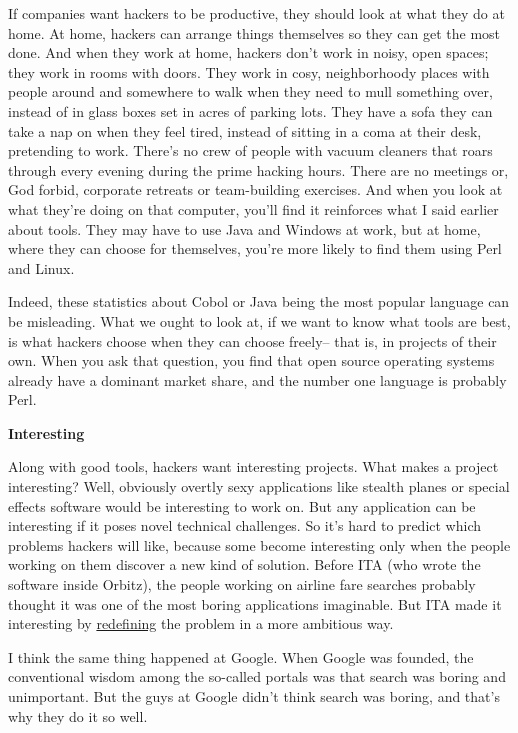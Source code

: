 If companies want hackers to be productive, they should look at what
they do at home. At home, hackers can arrange things themselves so they
can get the most done. And when they work at home, hackers don't work in
noisy, open spaces; they work in rooms with doors. They work in cosy,
neighborhoody places with people around and somewhere to walk when they
need to mull something over, instead of in glass boxes set in acres of
parking lots. They have a sofa they can take a nap on when they feel
tired, instead of sitting in a coma at their desk, pretending to work.
There's no crew of people with vacuum cleaners that roars through every
evening during the prime hacking hours. There are no meetings or, God
forbid, corporate retreats or team-building exercises. And when you look
at what they're doing on that computer, you'll find it reinforces what I
said earlier about tools. They may have to use Java and Windows at work,
but at home, where they can choose for themselves, you're more likely to
find them using Perl and Linux.

Indeed, these statistics about Cobol or Java being the most popular
language can be misleading. What we ought to look at, if we want to know
what tools are best, is what hackers choose when they can choose
freely-- that is, in projects of their own. When you ask that question,
you find that open source operating systems already have a dominant
market share, and the number one language is probably Perl.

\textbf{Interesting}

Along with good tools, hackers want interesting projects. What makes a
project interesting? Well, obviously overtly sexy applications like
stealth planes or special effects software would be interesting to work
on. But any application can be interesting if it poses novel technical
challenges. So it's hard to predict which problems hackers will like,
because some become interesting only when the people working on them
discover a new kind of solution. Before ITA (who wrote the software
inside Orbitz), the people working on airline fare searches probably
thought it was one of the most boring applications imaginable. But ITA
made it interesting by \href{carl.html}{redefining} the problem in a
more ambitious way.

I think the same thing happened at Google. When Google was founded, the
conventional wisdom among the so-called portals was that search was
boring and unimportant. But the guys at Google didn't think search was
boring, and that's why they do it so well.

